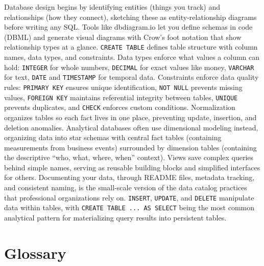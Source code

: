 \documentclass[
  letterpaper,
  DIV=11,
  numbers=noendperiod]{scrreprt}
\begin{document}
Database design begins by identifying entities (things you track) and
relationships (how they connect), sketching these as entity-relationship
diagrams before writing any SQL. Tools like dbdiagram.io let you define
schemas in code (DBML) and generate visual diagrams with Crow's foot
notation that show relationship types at a glance.
\texttt{CREATE\ TABLE} defines table structure with column names, data
types, and constraints. Data types enforce what values a column can
hold: \texttt{INTEGER} for whole numbers, \texttt{DECIMAL} for exact
values like money, \texttt{VARCHAR} for text, \texttt{DATE} and
\texttt{TIMESTAMP} for temporal data. Constraints enforce data quality
rules: \texttt{PRIMARY\ KEY} ensures unique identification,
\texttt{NOT\ NULL} prevents missing values, \texttt{FOREIGN\ KEY}
maintains referential integrity between tables, \texttt{UNIQUE} prevents
duplicates, and \texttt{CHECK} enforces custom conditions. Normalization
organizes tables so each fact lives in one place, preventing update,
insertion, and deletion anomalies. Analytical databases often use
dimensional modeling instead, organizing data into star schemas with
central fact tables (containing measurements from business events)
surrounded by dimension tables (containing the descriptive ``who, what,
where, when'' context). Views save complex queries behind simple names,
serving as reusable building blocks and simplified interfaces for
others. Documenting your data, through README files, metadata tracking,
and consistent naming, is the small-scale version of the data catalog
practices that professional organizations rely on. \texttt{INSERT},
\texttt{UPDATE}, and \texttt{DELETE} manipulate data within tables, with
\texttt{CREATE\ TABLE\ ...\ AS\ SELECT} being the most common analytical
pattern for materializing query results into persistent tables.

\section{Glossary}\label{glossary-9}
\end{document}
